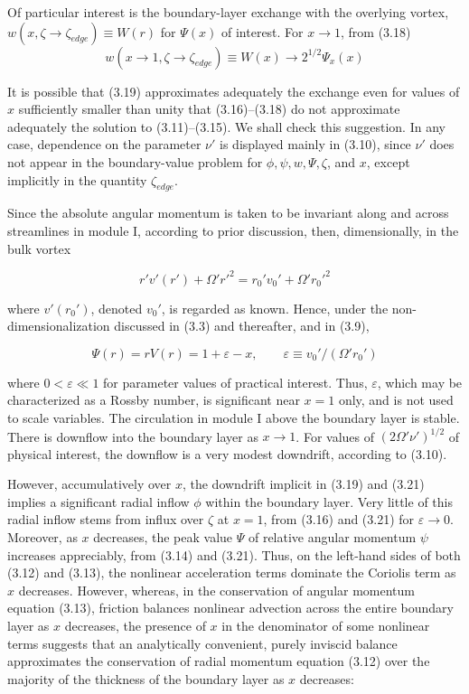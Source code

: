 \documentclass[preprint, prX]{revtex4}
\begin{document}
Of particular interest is the boundary-layer exchange with the overlying vortex,
$w(x, \zeta \rightarrow \zeta_{edge} ) \equiv W(r)$ for $\Psi(x)$ of interest. For $x \rightarrow 1$, from (3.18)
\begin{equation}
w(x\rightarrow 1, \zeta \rightarrow \zeta_{edge}) \equiv W(x) \rightarrow 2^{1/2} \Psi_x(x)
\end{equation}

It is possible that (3.19) approximates adequately the
exchange even for values of $x$ sufficiently smaller than unity that (3.16)–(3.18) do not approximate adequately the solution to (3.11)–(3.15). We shall check this suggestion. In any case, dependence on the parameter $\nu'$ is displayed mainly in (3.10), since $\nu'$ does not appear in the boundary-value problem for $\phi, \psi, w, \Psi, \zeta$, and $x$, except implicitly in the quantity $\zeta_{edge}$. 

Since the absolute angular momentum is taken to be invariant along and across streamlines in module I, according to prior discussion, then, dimensionally, in the bulk
vortex

\begin{equation}
r'v'(r') + \Omega' r'^2 = r_0' v_0' + \Omega' r_0'^2
\end{equation}

where $v'(r_0')$,  denoted $v_0'$, is regarded as known. Hence, under the non- dimensionalization discussed in (3.3) and thereafter, and in (3.9),

\begin{equation}
\Psi(r) = rV(r) = 1 + \varepsilon -x, \qquad \varepsilon \equiv v_0'/(\Omega' r_0')
\end{equation}

where $0 < \varepsilon \ll 1$ for parameter values of practical interest. Thus, $\varepsilon$, which may be characterized as a Rossby number, is significant near $x = 1$ only, and is not used to scale variables. The circulation in module I above the boundary layer is stable. There is downflow into the boundary layer as $x \rightarrow 1$. For values of $(2\Omega' \nu')^{1/2}$ of physical interest, the downflow is a very modest downdrift, according to (3.10).

However, accumulatively over $x$, the downdrift implicit in (3.19) and (3.21) implies a significant radial inflow $\phi$ within the boundary layer. Very little of this radial inflow stems from influx over $\zeta$ at $x = 1$, from (3.16) and (3.21) for $\varepsilon \rightarrow 0$. Moreover, as $x$ decreases, the peak value $\Psi$ of relative angular momentum $\psi$ increases appreciably, from (3.14) and (3.21). Thus, on the left-hand sides of both (3.12) and (3.13), the nonlinear acceleration terms dominate the Coriolis term as $x$ decreases. However, whereas, in the conservation of angular momentum equation (3.13), friction balances nonlinear advection across the entire boundary layer as $x$ decreases, the presence of $x$ in the denominator of some nonlinear terms suggests that an analytically convenient, purely inviscid balance approximates the conservation of radial momentum equation (3.12) over the majority of the thickness of the boundary layer as $x$ decreases:
\end{document}
